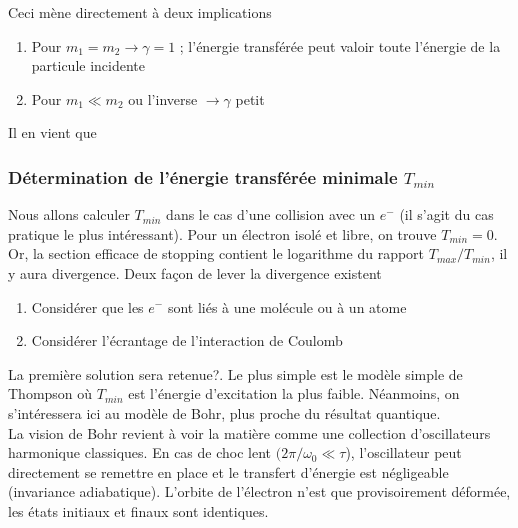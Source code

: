 Ceci mène directement à deux implications 
\begin{enumerate}
\item Pour $m_1=m_2 \to \gamma=1$ ; l'énergie transférée peut valoir toute l'énergie de la particule
incidente
\item Pour $m_1\ll m_2$ ou l'inverse $\to \gamma$ petit
\end{enumerate}
Il en vient que\\


\newpage
\subsubsection{Détermination de l'énergie transférée minimale $T_{min}$}
Nous allons calculer $T_{min}$ dans le cas d'une collision avec un $e^-$ (il s'agit du cas
pratique le plus intéressant). Pour un électron isolé et libre, on trouve $T_{min}=0$. Or, 
la section efficace de stopping contient le logarithme du rapport $T_{max}/T_{min}$, il y 
aura divergence. Deux façon de lever la divergence existent
\begin{enumerate}
\item Considérer que les $e^-$ sont liés à une molécule ou à un atome
\item Considérer l'écrantage de l'interaction de Coulomb
\end{enumerate}
La première solution sera retenue?. Le plus simple est le modèle simple de Thompson où 
$T_{min}$ est l'énergie d'excitation la plus faible. Néanmoins, on s'intéressera ici 
au modèle de Bohr, plus proche du résultat quantique.\\

La vision de Bohr revient à voir la matière comme une collection d'oscillateurs harmonique 
classiques. En cas de choc lent $(2\pi/\omega_0\ll \tau$), l'oscillateur peut directement 
se remettre en place et le transfert d'énergie est négligeable (invariance adiabatique). 
L'orbite de l'électron n'est que provisoirement déformée, les états initiaux et finaux sont
identiques.\\


